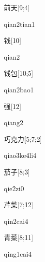 \begin{verbete}{前天}[9;4]
\begin{pronuncia}{qian2tian1}
\end{pronuncia}
\end{verbete}

\begin{verbete}[qian2]{钱}[10]
\begin{pronuncia}{qian2}
\end{pronuncia}
\end{verbete}

\begin{verbete}{钱包}[10;5]
\begin{pronuncia}{qian2bao1}
\end{pronuncia}
\end{verbete}

\begin{verbete}[qiang2]{强}[12]
\begin{pronuncia}{qiang2}
\end{pronuncia}
\end{verbete}

\begin{verbete}[qiao3ke4li4]{巧克力}[5;7;2]
\begin{pronuncia}{qiao3ke4li4}
\end{pronuncia}
\end{verbete}

\begin{verbete}[qie2zi0]{茄子}[8;3]
\begin{pronuncia}{qie2zi0}
\end{pronuncia}
\end{verbete}

\begin{verbete}{芹菜}[7;12]
\begin{pronuncia}{qin2cai4}
\end{pronuncia}
\end{verbete}

\begin{verbete}{青菜}[8;11]
\begin{pronuncia}{qing1cai4}
\end{pronuncia}
\end{verbete}

